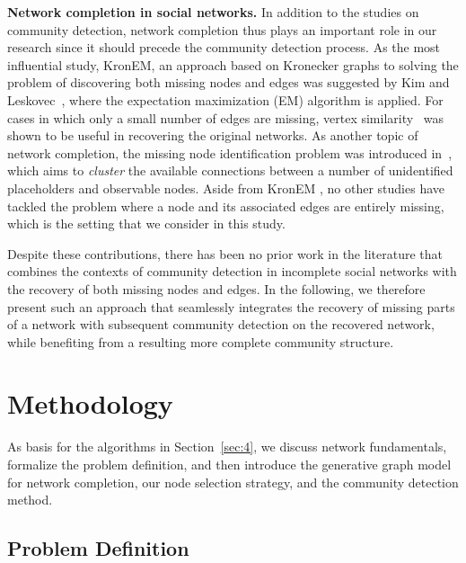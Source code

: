 \documentclass[format=acmsmall, review=false, screen=true]{acmart}
\begin{document}
{\bf Network completion in social networks.} In addition to the studies on community detection, network completion thus plays an important role in our research since it should precede the community detection process. As the most influential study, KronEM, an approach based on Kronecker graphs to solving the problem  of discovering both missing nodes and edges was suggested by Kim and Leskovec~\cite{kronem}, where the expectation maximization (EM) algorithm is applied. For cases in which only a small number of edges are missing, vertex similarity~\cite{chen2011capturing} was shown to be useful in recovering the original networks. As another topic of network completion, the missing node identification problem was introduced in~\cite{misc}, which aims to {\em cluster} the available connections between a number of unidentified placeholders and observable nodes. Aside from KronEM \cite{kronem}, no other studies have tackled the problem where a node and its associated edges are entirely missing, which is the setting that we consider in this study.

Despite these contributions, there has been no prior work in the literature that combines the contexts of community detection in incomplete social networks with the recovery of both missing nodes and edges. In the following, we therefore present such an approach that seamlessly integrates the recovery of missing parts of a network with subsequent community detection on the recovered network, while benefiting from a  resulting more complete community structure.

\section{Methodology}\label{sec:3}

As basis for the algorithms in Section~\ref{sec:4}, we discuss network fundamentals, formalize the problem definition, and then introduce the generative graph model for network completion, our node selection strategy, and the community detection method.

\subsection{Problem Definition}\label{sec:3a}
\end{document}
